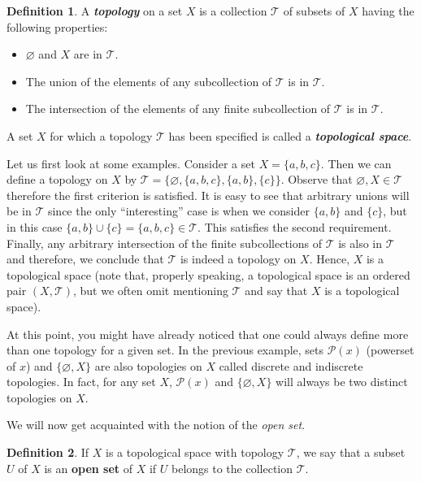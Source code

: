 \documentclass[a4paper, twocolumn]{article}
\newcommand{\pset}{\mathcal{P}}                  %
\newcommand{\topology}{\mathcal{T}}              %
\renewcommand{\emptyset}{\varnothing}            %
\theoremstyle{definition}
\newtheorem*{definition}{Definition}
\begin{document}
\begin{definition}
\cite{3} A \textit{\textbf{topology}} on a set $X$ is a collection $\topology$ of subsets of $X$ having
the following properties:

\begin{itemize}
\item[(1)]
$\emptyset$ and $X$ are in $\topology$.

\item[(2)]
The union of the elements of any subcollection of $\topology$ is in $\topology$.

\item[(3)]
The intersection of the elements of any finite subcollection of $\topology$ is in $\topology$.
\end{itemize}

A set $X$ for which a topology $\topology$ has been specified is called a \textit{\textbf{topological space}}.
\end{definition}

Let us first look at some examples. Consider a set $X = \{a, b, c\}$.
Then we can define a topology on $X$ by $\topology = \{\emptyset, \{a, b, c\}, \{a, b\}, \{c\}\}$.
Observe that $\emptyset, X \in \topology$ therefore the first criterion is satisfied.
It is easy to see that arbitrary unions will be in $\topology$ since the only ``interesting''
case is when we consider $\{a, b\}$ and $\{c\}$, but in this case $\{a, b\} \cup \{c\} = \{a, b, c\} \in \topology$.
This satisfies the second requirement. Finally, any arbitrary intersection of the finite subcollections of $\topology$
is also in $\topology$ and therefore, we conclude that $\topology$ is indeed a topology on $X$.
Hence, $X$ is a topological space (note that, properly speaking, a topological space is an ordered pair $(X, \topology)$,
but we often omit mentioning $\topology$ and say that $X$ is a topological space).

\medskip

At this point, you might have already noticed that one could always define more than one topology
for a given set. In the previous example, sets $\pset{(x)}$ (powerset of $x$) and $\{\emptyset, X\}$
are also topologies on $X$ called discrete and indiscrete topologies. In fact, for any set $X$,
$\pset{(x)}$ and $\{\emptyset, X\}$ will always be two distinct topologies on $X$.

\medskip

We will now get acquainted with the notion of the \textit{open set}.

\begin{definition}
\cite{4}  If $X$ is a topological space with topology $\topology$, we say that a subset $U$ of $X$ is an
\textbf{open set} of $X$ if $U$ belongs to the collection $\topology$.
\end{definition}
\end{document}
